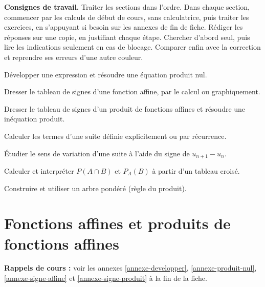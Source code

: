 \documentclass[10pt,a4paper]{article}
\begin{document}

\textbf{Consignes de travail.} Traiter les sections dans l'ordre. Dans chaque section, commencer par les calculs de début de cours, sans calculatrice, puis traiter les exercices, en s'appuyant si besoin sur les annexes de fin de fiche. Rédiger les réponses sur une copie, en justifiant chaque étape. Chercher d'abord seul, puis lire les indications seulement en cas de blocage. Comparer enfin avec la correction et reprendre ses erreurs d'une autre couleur.

\medskip

\begin{objectifs}
Développer une expression et résoudre une équation produit nul.\par\smallskip
Dresser le tableau de signes d'une fonction affine, par le calcul ou graphiquement.\par\smallskip
Dresser le tableau de signes d'un produit de fonctions affines et résoudre une inéquation produit.\par\smallskip
Calculer les termes d'une suite définie explicitement ou par récurrence.\par\smallskip
Étudier le sens de variation d'une suite à l'aide du signe de \(u_{n+1}-u_n\).\par\smallskip
Calculer et interpréter \(P(A\cap B)\) et \(P_A(B)\) à partir d'un tableau croisé.\par\smallskip
Construire et utiliser un arbre pondéré (règle du produit).
\end{objectifs}


\section{Fonctions affines et produits de fonctions affines}

\textbf{Rappels de cours :} voir les annexes \ref{annexe-developper}, \ref{annexe-produit-nul}, \ref{annexe-signe-affine} et \ref{annexe-signe-produit} à la fin de la fiche.
\nopagebreak
\end{document}
